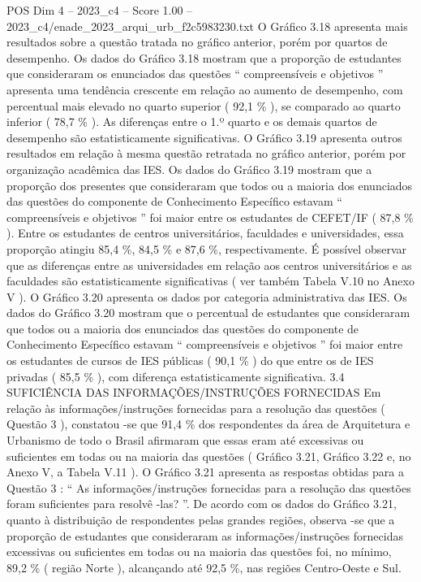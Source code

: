 \begin{textsample}{POS Dim 4 – 2023\_c4 – Score 1.00 – 2023\_c4/enade\_2023\_arqui\_urb\_f2c5983230.txt}
O Gráfico 3.18 apresenta mais resultados sobre a questão tratada no gráfico anterior, porém por quartos de desempenho.
Os dados do Gráfico 3.18 mostram que a proporção de estudantes que consideraram os enunciados das questões “ compreensíveis e objetivos ” apresenta uma tendência crescente em relação ao aumento de desempenho, com percentual mais elevado no quarto superior ( 92,1 \% ), se comparado ao quarto inferior ( 78,7 \% ).
As diferenças entre o 1.º quarto e os demais quartos de desempenho são estatisticamente significativas.
O Gráfico 3.19 apresenta outros resultados em relação à mesma questão retratada no gráfico anterior, porém por organização acadêmica das IES.
Os dados do Gráfico 3.19 mostram que a proporção dos presentes que consideraram que todos ou a maioria dos enunciados das questões do componente de Conhecimento Específico estavam “ compreensíveis e objetivos ” foi maior entre os estudantes de CEFET/IF ( 87,8 \% ).
Entre os estudantes de centros universitários, faculdades e universidades, essa proporção atingiu 85,4 \%, 84,5 \% e 87,6 \%, respectivamente.
É possível observar que as diferenças entre as universidades em relação aos centros universitários e as faculdades são estatisticamente significativas ( ver também Tabela V.10 no Anexo V ).
O Gráfico 3.20 apresenta os dados por categoria administrativa das IES.
Os dados do Gráfico 3.20 mostram que o percentual de estudantes que consideraram que todos ou a maioria dos enunciados das questões do componente de Conhecimento Específico estavam “ compreensíveis e objetivos ” foi maior entre os estudantes de cursos de IES públicas ( 90,1 \% ) do que entre os de IES privadas ( 85,5 \% ), com diferença estatisticamente significativa. 3.4 SUFICIÊNCIA DAS INFORMAÇÕES/INSTRUÇÕES FORNECIDAS Em relação às informações/instruções fornecidas para a resolução das questões ( Questão 3 ), constatou -se que 91,4 \% dos respondentes da área de Arquitetura e Urbanismo de todo o Brasil afirmaram que essas eram até excessivas ou suficientes em todas ou na maioria das questões ( Gráfico 3.21, Gráfico 3.22 e, no Anexo V, a Tabela V.11 ).
O Gráfico 3.21 apresenta as respostas obtidas para a Questão 3 : “ As informações/instruções fornecidas para a resolução das questões foram suficientes para resolvê -las? ”.
De acordo com os dados do Gráfico 3.21, quanto à distribuição de respondentes pelas grandes regiões, observa -se que a proporção de estudantes que consideraram as informações/instruções fornecidas excessivas ou suficientes em todas ou na maioria das questões foi, no mínimo, 89,2 \% ( região Norte ), alcançando até 92,5 \%, nas regiões Centro-Oeste e Sul.

\end{textsample}
